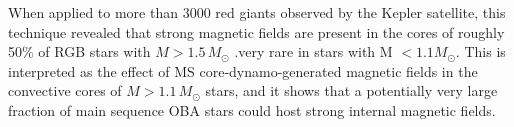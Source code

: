When applied to more than 3000 red giants observed by the Kepler satellite, this technique revealed that strong magnetic fields are present in the cores of roughly 50\% of RGB stars with $M \! > \! 1.5 \, M_\odot$ \citep{Stello_2016,Stello_2016a}.very rare in stars with M $< 1.1M_\odot$. This is interpreted as the effect of MS core-dynamo-generated magnetic fields in the convective cores of $M \! > \! 1.1 \, M_\odot$ stars, and it shows that a potentially very large fraction of main sequence OBA stars could host strong internal magnetic fields.



